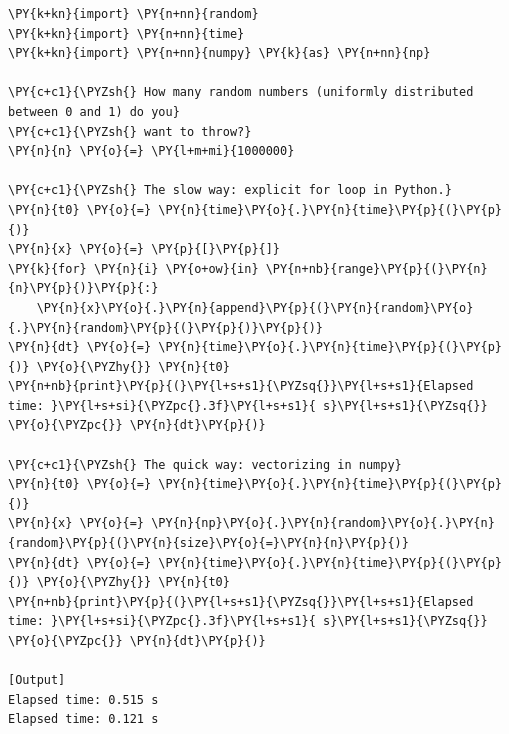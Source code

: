 \begin{Verbatim}[label=\makebox{\url{https://github.com/lucabaldini/cmepda/tree/master/slides/latex/snippets/vectorization.py}},commandchars=\\\{\}]
\PY{k+kn}{import} \PY{n+nn}{random}
\PY{k+kn}{import} \PY{n+nn}{time}
\PY{k+kn}{import} \PY{n+nn}{numpy} \PY{k}{as} \PY{n+nn}{np}

\PY{c+c1}{\PYZsh{} How many random numbers (uniformly distributed between 0 and 1) do you}
\PY{c+c1}{\PYZsh{} want to throw?}
\PY{n}{n} \PY{o}{=} \PY{l+m+mi}{1000000}

\PY{c+c1}{\PYZsh{} The slow way: explicit for loop in Python.}
\PY{n}{t0} \PY{o}{=} \PY{n}{time}\PY{o}{.}\PY{n}{time}\PY{p}{(}\PY{p}{)}
\PY{n}{x} \PY{o}{=} \PY{p}{[}\PY{p}{]}
\PY{k}{for} \PY{n}{i} \PY{o+ow}{in} \PY{n+nb}{range}\PY{p}{(}\PY{n}{n}\PY{p}{)}\PY{p}{:}
    \PY{n}{x}\PY{o}{.}\PY{n}{append}\PY{p}{(}\PY{n}{random}\PY{o}{.}\PY{n}{random}\PY{p}{(}\PY{p}{)}\PY{p}{)}
\PY{n}{dt} \PY{o}{=} \PY{n}{time}\PY{o}{.}\PY{n}{time}\PY{p}{(}\PY{p}{)} \PY{o}{\PYZhy{}} \PY{n}{t0}
\PY{n+nb}{print}\PY{p}{(}\PY{l+s+s1}{\PYZsq{}}\PY{l+s+s1}{Elapsed time: }\PY{l+s+si}{\PYZpc{}.3f}\PY{l+s+s1}{ s}\PY{l+s+s1}{\PYZsq{}} \PY{o}{\PYZpc{}} \PY{n}{dt}\PY{p}{)}

\PY{c+c1}{\PYZsh{} The quick way: vectorizing in numpy}
\PY{n}{t0} \PY{o}{=} \PY{n}{time}\PY{o}{.}\PY{n}{time}\PY{p}{(}\PY{p}{)}
\PY{n}{x} \PY{o}{=} \PY{n}{np}\PY{o}{.}\PY{n}{random}\PY{o}{.}\PY{n}{random}\PY{p}{(}\PY{n}{size}\PY{o}{=}\PY{n}{n}\PY{p}{)}
\PY{n}{dt} \PY{o}{=} \PY{n}{time}\PY{o}{.}\PY{n}{time}\PY{p}{(}\PY{p}{)} \PY{o}{\PYZhy{}} \PY{n}{t0}
\PY{n+nb}{print}\PY{p}{(}\PY{l+s+s1}{\PYZsq{}}\PY{l+s+s1}{Elapsed time: }\PY{l+s+si}{\PYZpc{}.3f}\PY{l+s+s1}{ s}\PY{l+s+s1}{\PYZsq{}} \PY{o}{\PYZpc{}} \PY{n}{dt}\PY{p}{)}

[Output]
Elapsed time: 0.515 s
Elapsed time: 0.121 s
\end{Verbatim}